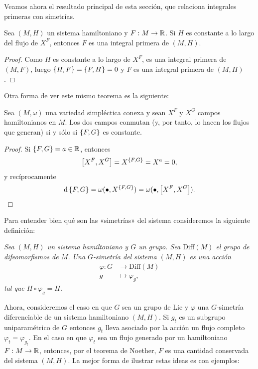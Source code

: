 Veamos ahora el resultado principal de esta sección, que relaciona integrales primeras con simetrías.
  \begin{prop}
    Sea $(M,H)$ un sistema hamiltoniano y $F:M \rightarrow \mathbb{R}$. Si $H$ es constante a lo largo del flujo de $X^F$, entonces $F$ es una integral primera de $(M,H)$. 
  \end{prop}
  \begin{proof}
    Como $H$ es constante a lo largo de $X^F$, es una integral primera de $(M,F)$, luego $\left\lbrace H,F\right\rbrace=\left\lbrace F,H\right\rbrace=0$ y $F$ es una integral primera de $(M,H)$. 
  \end{proof}
Otra forma de ver este mismo teorema es la siguiente:
\begin{prop}
  Sea $(M,\omega)$ una variedad simpléctica conexa y sean $X^F$ y $X^G$ campos hamiltonianos en $M$. Los dos campos conmutan (y, por tanto, lo hacen los flujos que generan) si y sólo si $\left\lbrace F,G\right\rbrace$ es constante. 
\end{prop}
\begin{proof}
  Si $\left\lbrace F,G\right\rbrace=a \in \mathbb{R}$, entonces
  \begin{equation*}
    \left[X^F,X^G\right]= X^{\left\lbrace F,G\right\rbrace} = X^a=0,
  \end{equation*}
  y recíprocamente
  \begin{equation*}
    \mathrm{d}\left\lbrace F,G\right\rbrace=\omega(\bullet,X^{\left\lbrace F,G\right\rbrace})=\omega(\bullet,\left[X^F,X^G\right]).
  \end{equation*}
\end{proof}

Para entender bien qué son las «simetrías» del sistema consideremos la siguiente definición:
\begin{defn}
  \em
  Sea $(M,H)$ un sistema hamiltoniano y $G$ un grupo. Sea $\mathrm{Diff}(M)$ el grupo de difeomorfismos de $M$. Una \emph{$G$-simetría} del sistema $(M,H)$ es una acción
  \begin{align*}
    \varphi :G&\longrightarrow \mathrm{Diff}(M)\\ 
      g &\longmapsto \varphi_g, 
    \end{align*}
    tal que $H\circ \varphi_g = H$.
\end{defn}

Ahora, consideremos el caso en que $G$ sea un grupo de Lie y $\varphi$ una $G$-simetría diferenciable de un sistema hamiltoniano $(M,H)$. Si $g_t$ es un subgrupo uniparamétrico de $G$ entonces $g_t$ lleva asociado por la acción un flujo completo $\varphi_t=\varphi_{g_t}$. En el caso en que $\varphi_t$ sea un flujo generado por un hamiltoniano $F:M\rightarrow \mathbb{R}$, entonces, por el teorema de Noether, $F$ es una cantidad conservada del sistema $(M,H)$. La mejor forma de ilustrar estas ideas es con ejemplos:

